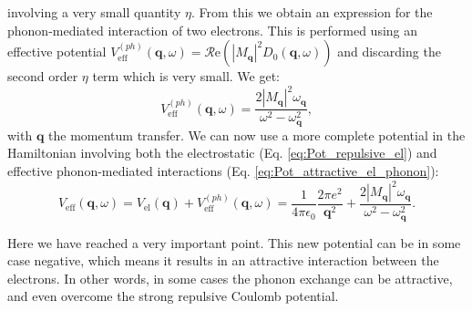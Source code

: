\documentclass[../main.tex]{subfile}
\begin{document}
involving a very small quantity $\eta$. From this we obtain an expression for the phonon-mediated interaction of two electrons.
This is performed using an effective potential $V^{(ph)}_{\text{eff}}(\bm{q},\omega) = \mathcal{R}\text{e}\left({|M_{\bm{q}}|^2 D_0(\bm{q},\omega)}\right)$ and discarding the second 
order $\eta$ term which is very small. We get:
\begin{equation}\label{eq:Pot_attractive_el_phonon}
    V^{(ph)}_{\text{eff}}(\bm{q},\omega) = \frac{2|M_{\bm{q}}|^2\omega_{\bm{q}}}{\omega^2 - \omega_{\bm{q}}^2},
\end{equation}
with $\bm{q}$ the momentum transfer. 
We can now use a more complete potential in the Hamiltonian involving both the electrostatic (Eq. \ref{eq:Pot_repulsive_el}) and effective
phonon-mediated interactions (Eq. \ref{eq:Pot_attractive_el_phonon}):
\begin{equation}\label{eq:V_eff_phonon}
    V_{\text{eff}}(\bm{q}, \omega) =  V_{\text{el}}(\bm{q}) + V^{(ph)}_{\text{eff}}(\bm{q},\omega)
     = \frac{1}{4\pi\epsilon_0} \frac{2\pi e^2}{\bm{q}^2} + \frac{2|M_{\bm{q}}|^2\omega_{\bm{q}}}{\omega^2 - \omega_{\bm{q}}^2}.
\end{equation}

Here we have reached a very important point. This new potential can be in some case negative, which means it results in an attractive interaction between the electrons. 
In other words, in some cases the phonon exchange can be attractive, and even overcome the strong repulsive Coulomb potential.
\end{document}
